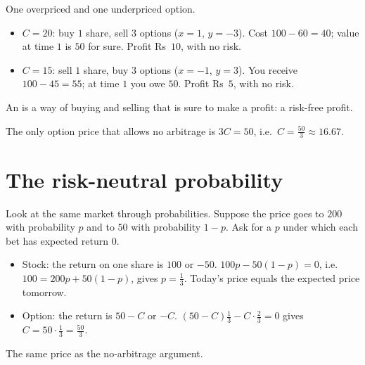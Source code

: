 \begin{example}
\label{ex:arb}
One overpriced and one underpriced option.
\begin{itemize}
  \item $C=20$: buy $1$ share, sell $3$ options ($x=1$, $y=-3$). Cost $100-60=40$; value at time $1$ is $50$ for sure. Profit Rs~$10$, with no risk.
  \item $C=15$: sell $1$ share, buy $3$ options ($x=-1$, $y=3$). You receive $100-45=55$; at time $1$ you owe $50$. Profit Rs~$5$, with no risk.
\end{itemize}
\end{example}

\begin{definition}[Arbitrage]
An  is a way of buying and selling that is sure to make a profit: a risk-free profit.
\end{definition}

The only option price that allows no arbitrage is $3C=50$, i.e.\ $C=\frac{50}{3}\approx16.67$.

\begin{pic}
\end{pic}

\section{The risk-neutral probability}

Look at the same market through probabilities. Suppose the price goes to $200$ with probability $p$ and to $50$ with probability $1-p$. Ask for a $p$ under which each bet has expected return $0$.
\begin{itemize}
  \item Stock: the return on one share is $100$ or $-50$. $100p-50(1-p)=0$, i.e.\ $100=200p+50(1-p)$, gives $p=\frac13$. Today's price equals the expected price tomorrow.
  \item Option: the return is $50-C$ or $-C$. $(50-C)\frac13-C\cdot\frac23=0$ gives $C=50\cdot\frac13=\frac{50}{3}$.
\end{itemize}
The same price as the no-arbitrage argument.

